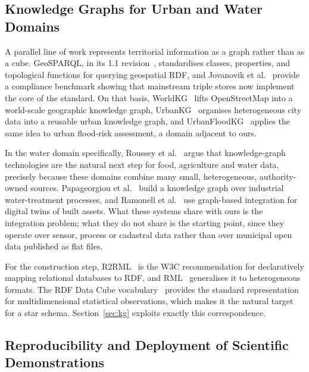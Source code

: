\documentclass[runningheads]{llncs}
\renewcommand{\_}{\origunderscore\allowbreak}
\newif\ifshowchanges
\newenvironment{chgblock}{\ifshowchanges\color{chg}\fi}{}
\begin{document}
\begin{chgblock}
\subsection{Knowledge Graphs for Urban and Water Domains}
\label{sec:rw_kg}

A parallel line of work represents territorial information as a graph rather
than as a cube. GeoSPARQL, in its 1.1 revision~\cite{geosparql11,carhomburg2022},
standardises classes, properties, and topological functions for querying
geospatial RDF, and Jovanovik et al.~\cite{jovanovik2021} provide a compliance
benchmark showing that mainstream triple stores now implement the core of the
standard. On that basis, WorldKG~\cite{dsouza2021} lifts OpenStreetMap into a
world-scale geographic knowledge graph, UrbanKG~\cite{liu2023} organises
heterogeneous city data into a reusable urban knowledge graph, and
UrbanFloodKG~\cite{wang2023} applies the same idea to urban flood-risk
assessment, a domain adjacent to ours.

In the water domain specifically, Roussey et al.~\cite{roussey2023} argue that
knowledge-graph technologies are the natural next step for food, agriculture and
water data, precisely because these domains combine many small, heterogeneous,
authority-owned sources. Papageorgiou et al.~\cite{papageorgiou2025} build a
knowledge graph over industrial water-treatment processes, and Ramonell et
al.~\cite{ramonell2023} use graph-based integration for digital twins of built
assets. What these systems share with ours is the integration problem; what they
do not share is the starting point, since they operate over sensor, process or
cadastral data rather than over municipal open data published as flat files.

For the construction step, R2RML~\cite{r2rml} is the W3C recommendation for
declaratively mapping relational databases to RDF, and RML~\cite{dimou2014}
generalises it to heterogeneous formats. The RDF Data Cube
vocabulary~\cite{datacube} provides the standard representation for
multidimensional statistical observations, which makes it the natural target for
a star schema. Section~\ref{sec:kg} exploits exactly this correspondence.
\end{chgblock}

\subsection{Reproducibility and Deployment of Scientific Demonstrations}
\end{document}
